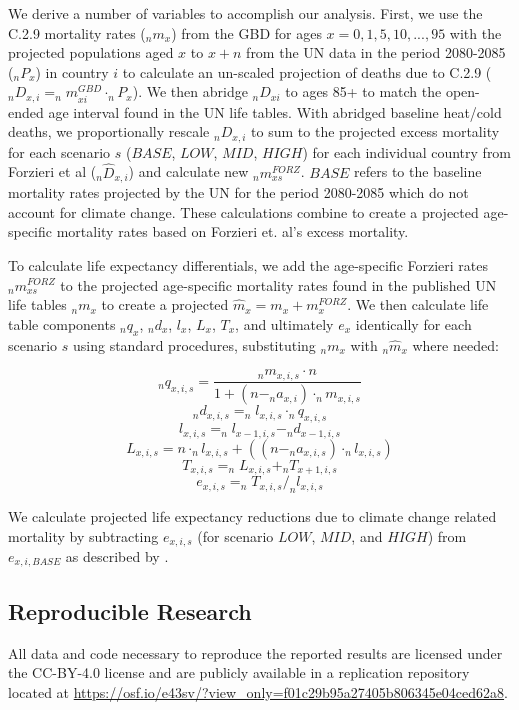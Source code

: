 \documentclass[12pt]{article}
\begin{document}
We derive a number of variables to accomplish our analysis. First, we
use the C.2.9 mortality rates (\(_nm_x\)) from the GBD for ages
\(x=0,1,5,10,...,95\) with the projected populations aged \(x\) to
\(x+n\) from the UN data in the period 2080-2085 (\(_nP_x\)) in country
\(i\) to calculate an un-scaled projection of deaths due to C.2.9
(\(_nD_{x,i}=_nm_{xi}^{GBD} \cdot _nP_x\)). We then abridge \(_nD_{xi}\)
to ages 85+ to match the open-ended age interval found in the UN life
tables. With abridged baseline heat/cold deaths, we proportionally
rescale \(_nD_{x,i}\) to sum to the projected excess mortality for each
scenario \(s\) (\(BASE\), \(LOW\), \(MID\), \(HIGH\)) for each
individual country from Forzieri et al \citep{forzieri2017increasing}
(\(_n\hat{D}_{x,i}\)) and calculate new \(_nm_{xs}^{FORZ}\). \(BASE\)
refers to the baseline mortality rates projected by the UN for the
period 2080-2085 which do not account for climate change. These
calculations combine to create a projected age-specific mortality rates
based on Forzieri et. al's excess mortality.

To calculate life expectancy differentials, we add the age-specific
Forzieri rates \(_nm_{xs}^{FORZ}\) to the projected age-specific
mortality rates found in the published UN life tables \(_nm_x\) to
create a projected \(\hat{m}_x=m_x + m_x^{FORZ}\). We then calculate
life table components \(_nq_x\), \(_nd_x\), \(l_x\), \(L_x\), \(T_x\),
and ultimately \(e_x\) identically for each scenario \(s\) using
standard procedures, substituting \(_nm_x\) with \(_n\hat{m}_x\) where
needed:

\[_nq_{x,i,s} = \frac{_nm_{x,i,s}\cdot  n}{1+(n-_na_{x,i}) \cdot _nm_{x,i,s}}\]
\[_nd_{x,i,s} = _nl_{x,i,s} \cdot _nq_{x,i,s}\]
\[l_{x,i,s} = _nl_{x-1,i,s} - _nd_{x-1,i,s}\]
\[L_{x,i,s} = n \cdot _nl_{x,i,s} + ((n-_na_{x,i,s}) \cdot _nl_{x,i,s})\]
\[T_{x,i,s} = _nL_{x,i,s} + _nT_{x+1,i,s}\]
\[e_{x,i,s} = _nT_{x,i,s} / _nl_{x,i,s}\]

We calculate projected life expectancy reductions due to climate change
related mortality by subtracting \(e_{x,i,s}\) (for scenario \(LOW\),
\(MID\), and \(HIGH\)) from \(e_{x,i,BASE}\) as described by
\citep{beltran2008integrated}.

\hypertarget{reproducible-research}{%
\subsection{Reproducible Research}\label{reproducible-research}}

All data and code necessary to reproduce the reported results are
licensed under the CC-BY-4.0 license and are publicly available in a
replication repository located at
\url{https://osf.io/e43sv/?view_only=f01c29b95a27405b806345e04ced62a8}.
\end{document}
